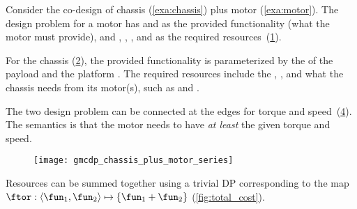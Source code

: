 \begin{example}
  \label{exa:chassis_plus_motor}Consider the co-design of chassis (\cref{exa:chassis})
  plus motor (\cref{exa:motor}). The design problem for a motor has 
  and  as the provided functionality (what the motor must
  provide), and , , , and 
  as the required resources~(\cref{fig:motor}).

  \begin{figure}[h]
    \centering
    \caption{\label{fig:motor}}
  \end{figure}


  \noindent For the chassis (\cref{fig:gmcdp_chassis}), the provided
  functionality is parameterized by the  of the payload and
  the platform . The required resources include the ,
  , and what the chassis needs from its motor(s), such
  as  and .

  \begin{figure}[h]
    \centering
    \caption{\label{fig:gmcdp_chassis}}
  \end{figure}


  \noindent The two design problem can be connected at the edges for
  torque and speed~(\cref{fig:gmcdp_chassis_plus_motor_series}). The
  semantics is that the motor needs to have\emph{ at least }the given
  torque and speed.

  \begin{figure}[h]
    \centering
    \texttt{[image: gmcdp\_chassis\_plus\_motor\_series]}
    \caption{\label{fig:gmcdp_chassis_plus_motor_series}}
  \end{figure}

  \begin{figure}[h!]
    \centering
    \caption{\label{fig:gmcdp_chassis_plus_motor_series}}
  \end{figure}

  Resources can be summed together using a trivial DP corresponding
  to the map $\ftor:\left\langle \fun_{1},\fun_{2}\right\rangle \mapsto\{\fun_{1}+\fun_{2}\}$
  (\cref{fig:total_cost}).


\end{example}
